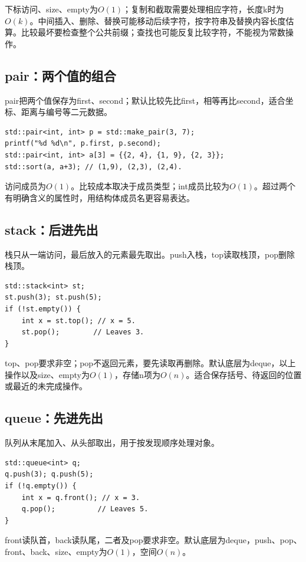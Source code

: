 \documentclass[UTF8,11pt,a4paper,fontset=none]{ctexart}
\begin{document}
下标访问、size、empty为$O(1)$；复制和截取需要处理相应字符，长度k时为$O(k)$。中间插入、删除、替换可能移动后续字符，按字符串及替换内容长度估算。比较最坏要检查整个公共前缀；查找也可能反复比较字符，不能视为常数操作。

\subsection{pair：两个值的组合}
pair把两个值保存为first、second；默认比较先比first，相等再比second，适合坐标、距离与编号等二元数据。
\par\noindent\begin{minipage}{\linewidth}
\begin{lstlisting}
std::pair<int, int> p = std::make_pair(3, 7);
printf("%d %d\n", p.first, p.second);
std::pair<int, int> a[3] = {{2, 4}, {1, 9}, {2, 3}};
std::sort(a, a+3); // (1,9), (2,3), (2,4).
\end{lstlisting}
\end{minipage}\par
访问成员为$O(1)$。比较成本取决于成员类型；int成员比较为$O(1)$。超过两个有明确含义的属性时，用结构体成员名更容易表达。

\subsection{stack：后进先出}
栈只从一端访问，最后放入的元素最先取出。push入栈，top读取栈顶，pop删除栈顶。
\par\noindent\begin{minipage}{\linewidth}
\begin{lstlisting}
std::stack<int> st;
st.push(3); st.push(5);
if (!st.empty()) {
    int x = st.top(); // x = 5.
    st.pop();        // Leaves 3.
}
\end{lstlisting}
\end{minipage}\par
top、pop要求非空；pop不返回元素，要先读取再删除。默认底层为deque，以上操作以及size、empty为$O(1)$，存储n项为$O(n)$。适合保存括号、待返回的位置或最近的未完成操作。

\subsection{queue：先进先出}
队列从末尾加入、从头部取出，用于按发现顺序处理对象。
\par\noindent\begin{minipage}{\linewidth}
\begin{lstlisting}
std::queue<int> q;
q.push(3); q.push(5);
if (!q.empty()) {
    int x = q.front(); // x = 3.
    q.pop();          // Leaves 5.
}
\end{lstlisting}
\end{minipage}\par
front读队首，back读队尾，二者及pop要求非空。默认底层为deque，push、pop、front、back、size、empty为$O(1)$，空间$O(n)$。
\end{document}
